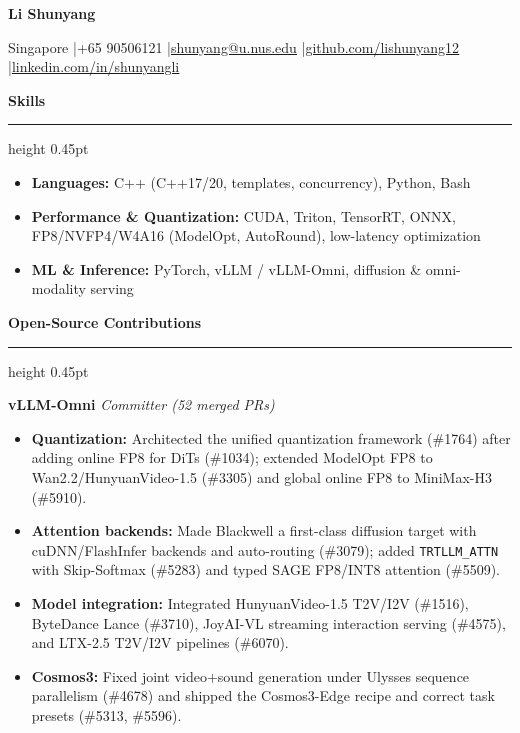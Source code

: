 \documentclass[10pt,letterpaper]{article}
\newcommand{\cvsection}[1]{%
  \vspace{8pt}%
  {\fontsize{13.5pt}{15pt}\selectfont\bfseries #1}\par
  \vspace{1.5pt}\hrule height 0.45pt\vspace{3pt}%
}
\newcommand{\projectrole}[2]{%
  \textbf{#1} \textit{#2}\par\vspace{-1pt}%
}
\newenvironment{cvitems}{%
  \begin{itemize}[
    leftmargin=0.285in,
    labelsep=0.075in,
    itemsep=1.2pt,
    topsep=1.5pt,
    parsep=0pt,
    partopsep=0pt
  ]\raggedright
}{\end{itemize}}
\begin{document}
\begin{center}
  {\fontsize{22pt}{24pt}\selectfont\bfseries Li Shunyang}\par
  \vspace{7pt}
  {\fontsize{10pt}{12pt}\selectfont
    Singapore
    \enspace|\enspace +65 90506121
    \enspace|\enspace \href{mailto:shunyang@u.nus.edu}{\underline{shunyang@u.nus.edu}}
    \enspace|\enspace \href{https://github.com/lishunyang12}{\underline{github.com/lishunyang12}}
    \enspace|\enspace \href{https://linkedin.com/in/shunyangli}{\underline{linkedin.com/in/shunyangli}}}
\end{center}

\vspace{7pt}

\cvsection{Skills}
\begin{cvitems}
  \item \textbf{Languages:} C++ (C++17/20, templates, concurrency), Python, Bash
  \item \textbf{Performance \& Quantization:} CUDA, Triton, TensorRT, ONNX, FP8/NVFP4/W4A16 (ModelOpt, AutoRound), low-latency optimization
  \item \textbf{ML \& Inference:} PyTorch, vLLM / vLLM-Omni, diffusion \& omni-modality serving
\end{cvitems}

\cvsection{Open-Source Contributions}
\projectrole{vLLM-Omni}{Committer (52 merged PRs)}
\begin{cvitems}
  \item \textbf{Quantization:} Architected the unified quantization framework (\#1764) after adding online FP8 for DiTs (\#1034); extended ModelOpt FP8 to Wan2.2/HunyuanVideo-1.5 (\#3305) and global online FP8 to MiniMax-H3 (\#5910).
  \item \textbf{Attention backends:} Made Blackwell a first-class diffusion target with cuDNN/FlashInfer backends and auto-routing (\#3079); added \texttt{TRTLLM\_ATTN} with Skip-Softmax (\#5283) and typed SAGE FP8/INT8 attention (\#5509).
  \item \textbf{Model integration:} Integrated HunyuanVideo-1.5 T2V/I2V (\#1516), ByteDance Lance (\#3710), JoyAI-VL streaming interaction serving (\#4575), and LTX-2.5 T2V/I2V pipelines (\#6070).
  \item \textbf{Cosmos3:} Fixed joint video+sound generation under Ulysses sequence parallelism (\#4678) and shipped the Cosmos3-Edge recipe and correct task presets (\#5313, \#5596).
\end{cvitems}
\end{document}
